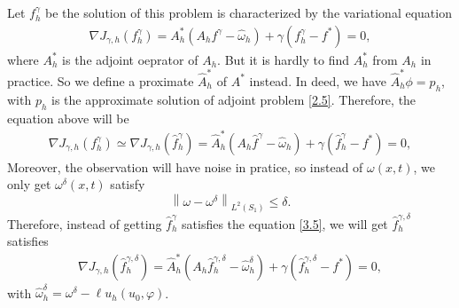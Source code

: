 \documentclass[]{article}
\begin{document}
Let $f^\gamma_h$ be the solution of this problem is characterized by the variational equation
\begin{align}\label{3.4}
	\nabla J_{\gamma, h}(f^\gamma_h)= A_h^*(A_hf^\gamma-\hat{\omega}_h)+\gamma(f^\gamma_h-f^*)=0,
\end{align}
where $A_h^*$ is the adjoint oeprator of $A_h$. But it is hardly to find $A^*_h$ from $A_h$ in practice. So we define a proximate $\hat{A}_h^*$ of $A^*$ instead. In deed, we have $\hat{A}^*_h\phi=p_h$, with $p_h$ is the approximate solution of adjoint problem \eqref{2.5}. Therefore, the equation above will be
\begin{align}\label{3.5}
	\nabla J_{\gamma, h}(f^\gamma_h)\simeq\nabla J_{\gamma, h}(\hat{f}^\gamma_h)= \hat{A}_h^*(A_h\hat{f}^\gamma-\hat{\omega}_h)+\gamma(\hat{f}^\gamma_h-f^*)=0,
\end{align}
Moreover, the observation will have noise in pratice, so instead of $\omega(x, t)$, we only get $\omega^{\delta}(x, t)$ satisfy
$$\left\| \omega-\omega^\delta\right\|_{L^2(S_1)}\leq \delta.$$
Therefore, instead of getting $\hat{f}^\gamma_h$ satisfies the equation \eqref{3.5}, we will get $\hat{f}^{\gamma, \delta}_h$ satisfies
\begin{align}\label{3.6}
	\nabla J_{\gamma, h}\left(\hat{f}^{\gamma, \delta}_h\right)= \hat{A}_h^*(A_h\hat{f}^{\gamma, \delta}_h-\hat{\omega}_h^\delta)+\gamma(\hat{f}^{\gamma, \delta}_h-f^*)=0,
\end{align}
with $\hat{\omega}_h^\delta=\omega^\delta-\ell u_h(u_0, \varphi)$.
\end{document}
